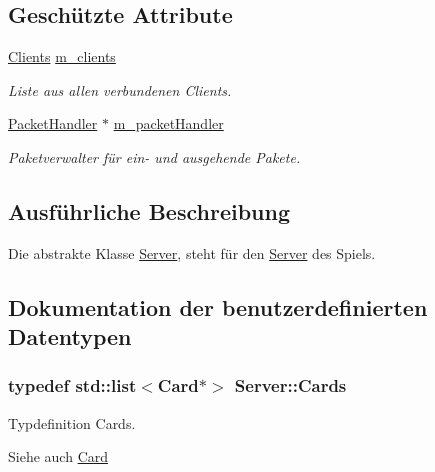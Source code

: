 \subsection*{Geschützte Attribute}
\begin{DoxyCompactItemize}
\item 
\hyperlink{class_server_a2642184a6bcfa2be2b0670e27dcf1e18}{Clients} \hyperlink{class_server_ab5a2930921b8b38e303934a9a4d0bc41}{m\+\_\+clients}
\begin{DoxyCompactList}\small\item\em Liste aus allen verbundenen Clients. \end{DoxyCompactList}\item 
\hyperlink{class_packet_handler}{Packet\+Handler} $\ast$ \hyperlink{class_server_a1f34d45e9f5cae0325e2b5ecc80bc2b5}{m\+\_\+packet\+Handler}
\begin{DoxyCompactList}\small\item\em Paketverwalter für ein-\/ und ausgehende Pakete. \end{DoxyCompactList}\end{DoxyCompactItemize}


\subsection{Ausführliche Beschreibung}
Die abstrakte Klasse \hyperlink{class_server}{Server}, steht für den \hyperlink{class_server}{Server} des Spiels. 

\subsection{Dokumentation der benutzerdefinierten Datentypen}
\hypertarget{class_server_a2b2ff2c4678bdca3599c3feb5efdaff7}{}
\subsubsection[{Cards}]{\setlength{\rightskip}{0pt plus 5cm}typedef std\+::list$<${\bf Card}$\ast$$>$ {\bf Server\+::\+Cards}\hspace{0.3cm}{\ttfamily [protected]}}\label{class_server_a2b2ff2c4678bdca3599c3feb5efdaff7}


Typdefinition Cards. 

\begin{DoxySeeAlso}{Siehe auch}
\hyperlink{class_card}{Card} 
\end{DoxySeeAlso}
\hypertarget{class_server_a31786b51863a753101d409d1e14c0b9a}{}

